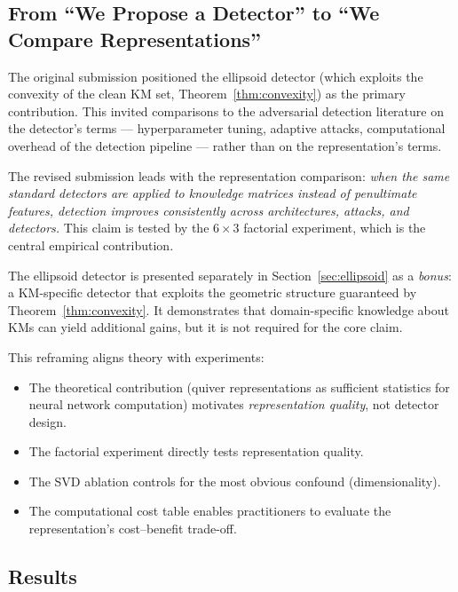 \subsection{From ``We Propose a Detector'' to ``We Compare Representations''}
\label{sec:reframing}

The original submission positioned the ellipsoid detector (which exploits the convexity of the clean KM set, Theorem~\ref{thm:convexity}) as the primary contribution.
This invited comparisons to the adversarial detection literature on the detector's terms --- hyperparameter tuning, adaptive attacks, computational overhead of the detection pipeline --- rather than on the representation's terms.

The revised submission leads with the representation comparison:
\emph{when the same standard detectors are applied to knowledge matrices instead of penultimate features, detection improves consistently across architectures, attacks, and detectors.}
This claim is tested by the $6 \times 3$ factorial experiment, which is the central empirical contribution.

The ellipsoid detector is presented separately in Section~\ref{sec:ellipsoid} as a \emph{bonus}: a KM-specific detector that exploits the geometric structure guaranteed by Theorem~\ref{thm:convexity}.
It demonstrates that domain-specific knowledge about KMs can yield additional gains, but it is not required for the core claim.

This reframing aligns theory with experiments:
\begin{itemize}
    \item The theoretical contribution (quiver representations as sufficient statistics for neural network computation) motivates \emph{representation quality}, not detector design.
    \item The factorial experiment directly tests representation quality.
    \item The SVD ablation controls for the most obvious confound (dimensionality).
    \item The computational cost table enables practitioners to evaluate the representation's cost--benefit trade-off.
\end{itemize}


\subsection{Results}
\label{sec:comparison_results}

